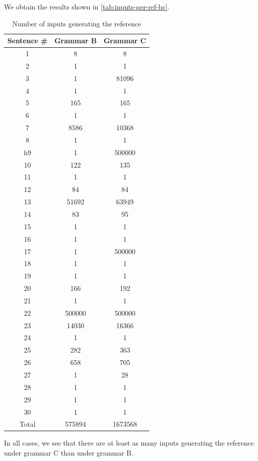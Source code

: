 \documentclass[a4paper,oneside,reqno]{amsart}
\begin{document}
\begin{enumerate}[label=\arabic*.]
    We obtain the results shown in \autoref{tab:inputs-per-ref-bc}.
    \begin{table}[h]
      \begin{tabular}{ccc}
        \toprule
        Sentence \# & Grammar B & Grammar C \\
        \midrule
        1 & 8 & 8 \\
        2 & 1 & 1 \\
        3 & 1 & 81096 \\
        4 & 1 & 1 \\
        5 & 165 & 165 \\
        6 & 1 & 1 \\
        7 & 8586 & 10368 \\
        8 & 1 & 1 \\
        h9 & 1 & 500000 \\
        10 & 122 & 135 \\
        11 & 1 & 1 \\
        12 & 84 & 84 \\
        13 & 51692 & 63949 \\
        14 & 83 & 95 \\
        15 & 1 & 1 \\
        16 & 1 & 1 \\
        17 & 1 & 500000 \\
        18 & 1 & 1 \\
        19 & 1 & 1 \\
        20 & 166 & 192 \\
        21 & 1 & 1 \\
        22 & 500000 & 500000 \\
        23 & 14030 & 16366 \\
        24 & 1 & 1 \\
        25 & 282 & 363 \\
        26 & 658 & 705 \\
        27 & 1 & 28 \\
        28 & 1 & 1 \\
        29 & 1 & 1 \\
        30 & 1 & 1 \\
        \hline
        Total & 575894 & 1673568\\
        \bottomrule
      \end{tabular}
      \caption{Number of inputs generating the reference}
      \label{tab:inputs-per-ref-bc}
    \end{table}
    In all cases, we see that there are at least as many inputs
    generating the reference under grammar C than under grammar B.


\end{enumerate}
\end{document}
